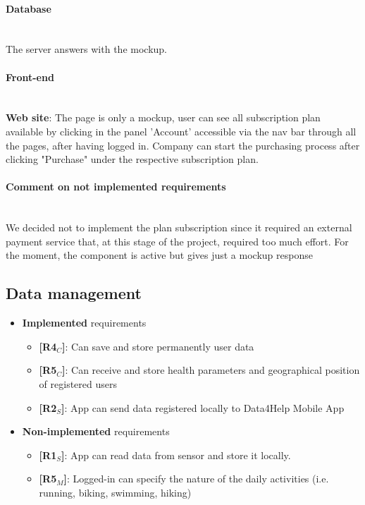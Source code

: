\paragraph{Database} \mbox{}\\ 
The server answers with the mockup.
\paragraph{Front-end} \mbox{}\\
\textbf{Web site}: The page is only a mockup, user can see all subscription plan available by clicking in the panel 'Account' accessible via the nav bar through all the pages, after having logged in.
Company can start the purchasing process after clicking "Purchase" under the respective subscription plan.

\paragraph{Comment on not implemented requirements} \mbox{}\\ 
We decided not to implement the plan subscription since it required an external payment service that, at this stage of the project, required too much effort.
For the moment, the component is active but gives just a mockup response


\subsection{Data management}
\begin{itemize}
    \item \textbf{Implemented} requirements
        \begin{itemize}
    
        \item \textbf{[R4$_C$]}: Can save and store permanently user data
    \item \textbf{[R5$_C$]}: Can receive and store health parameters and geographical position of registered users
     \item \textbf{[R2$_S$]}: App can send data registered locally to Data4Help Mobile App
     
        \end{itemize}
    \item \textbf{Non-implemented} requirements
    \begin{itemize}
    \item \textbf{[R1$_S$]}: App can read data from sensor and store it locally.
     
      \item \textbf{[R5$_M$]}: Logged-in can specify the nature of the daily activities (i.e. running, biking, swimming, hiking)

        \end{itemize}
\end{itemize}

